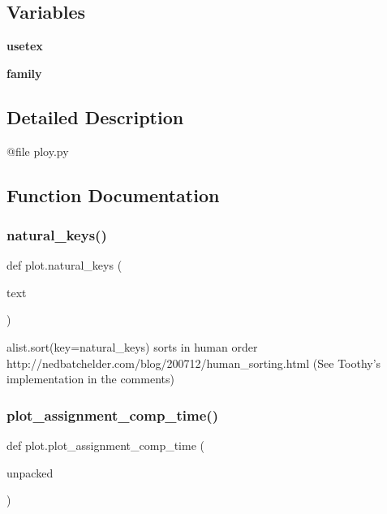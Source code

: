 \subsection*{Variables}
\begin{DoxyCompactItemize}
\item 
\mbox{\label{namespaceplot_a44a287261f1efb1d265545a025ca5acb}} 
{\bfseries usetex}
\item 
\mbox{\label{namespaceplot_aac1dc0d3422764d575ddad61522d9ee5}} 
{\bfseries family}
\end{DoxyCompactItemize}


\subsection{Detailed Description}
\begin{DoxyVerb}@file ploy.py
\end{DoxyVerb}
 

\subsection{Function Documentation}
\mbox{\label{namespaceplot_a4f94bf2cfe8afc4ea063feb3df961780}} 
\subsubsection{\texorpdfstring{natural\_keys()}{natural\_keys()}}
{\footnotesize\ttfamily def plot.\+natural\+\_\+keys (\begin{DoxyParamCaption}\item[{}]{text }\end{DoxyParamCaption})}

\begin{DoxyVerb}alist.sort(key=natural_keys) sorts in human order
http://nedbatchelder.com/blog/200712/human_sorting.html
(See Toothy's implementation in the comments)
\end{DoxyVerb}
 \mbox{\label{namespaceplot_a4aaddd2ee72a3518cb543c50095c6489}} 
\subsubsection{\texorpdfstring{plot\_assignment\_comp\_time()}{plot\_assignment\_comp\_time()}}
{\footnotesize\ttfamily def plot.\+plot\+\_\+assignment\+\_\+comp\+\_\+time (\begin{DoxyParamCaption}\item[{}]{unpacked }\end{DoxyParamCaption})}

